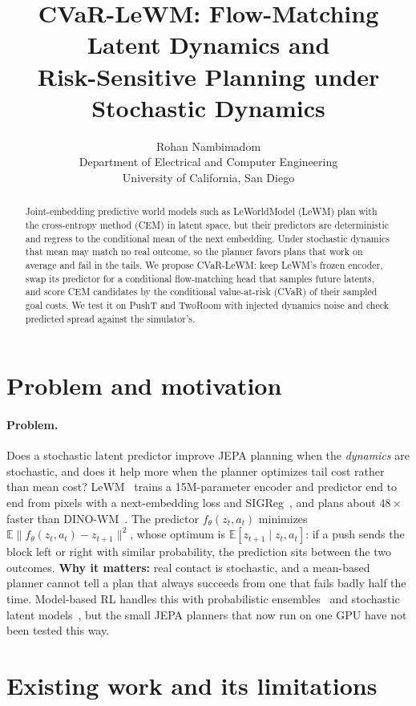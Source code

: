 \documentclass{article}
\title{CVaR-LeWM: Flow-Matching Latent Dynamics and\\Risk-Sensitive Planning under Stochastic Dynamics}
\author{%
  Rohan Nambimadom\\
  Department of Electrical and Computer Engineering\\
  University of California, San Diego\\
}
\newcommand{\E}{\mathbb{E}}
\begin{document}
\maketitle

\begin{abstract}
Joint-embedding predictive world models such as LeWorldModel (LeWM) plan with the cross-entropy method (CEM) in latent space, but their predictors are deterministic and regress to the conditional mean of the next embedding. Under stochastic dynamics that mean may match no real outcome, so the planner favors plans that work on average and fail in the tails. We propose CVaR-LeWM: keep LeWM's frozen encoder, swap its predictor for a conditional flow-matching head that samples future latents, and score CEM candidates by the conditional value-at-risk (CVaR) of their sampled goal costs. We test it on PushT and TwoRoom with injected dynamics noise and check predicted spread against the simulator's.
\end{abstract}

\section{Problem and motivation}

\paragraph{Problem.} Does a stochastic latent predictor improve JEPA planning when the \emph{dynamics} are stochastic, and does it help more when the planner optimizes tail cost rather than mean cost? LeWM~\cite{maes2026lewm} trains a 15M-parameter encoder and predictor end to end from pixels with a next-embedding loss and SIGReg~\cite{balestriero2025lejepa}, and plans about $48\times$ faster than DINO-WM~\cite{zhou2025dinowm}. The predictor $f_\theta(z_t,a_t)$ minimizes $\E\|f_\theta(z_t,a_t)-z_{t+1}\|^2$, whose optimum is $\E[z_{t+1}\mid z_t,a_t]$: if a push sends the block left or right with similar probability, the prediction sits between the two outcomes. \textbf{Why it matters:} real contact is stochastic, and a mean-based planner cannot tell a plan that always succeeds from one that fails badly half the time. Model-based RL handles this with probabilistic ensembles~\cite{chua2018pets} and stochastic latent models~\cite{hafner2025dreamerv3}, but the small JEPA planners that now run on one GPU have not been tested this way.

\section{Existing work and its limitations}
\end{document}
